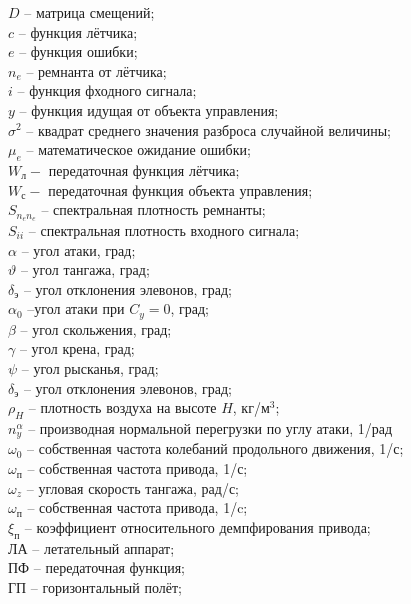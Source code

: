 $D$ -- матрица смещений; \\  
$c$ -- функция лётчика; \\
$e$ -- функция ошибки; \\ 
$n_e$ -- ремнанта от лётчика; \\  
$i$ -- функция фходного сигнала; \\ 
$y$ -- функция идущая от объекта управления; \\ 
$\sigma^2$ -- квадрат среднего значения разброса случайной величины; \\ 
$\mu_e$ -- математическое ожидание ошибки; \\ 
$W_\text{л} - $  передаточная функция лётчика; \\ 
$W_\text{с} - $  передаточная функция объекта управления; \\ 
$S_{n_e  n_e}$ -- спектральная плотность ремнанты; \\ 
$S_{ii}$ -- спектральная плотность входного сигнала; \\ 
$\alpha$ -- угол атаки, град; \\ 
$\vartheta$ -- угол тангажа, град; \\ 
$\delta_\text{э}$ -- угол отклонения элевонов, град; \\ 
$\alpha_0$ --угол атаки при $C_y = 0$, град;\\
$\beta$ -- угол скольжения, град; \\
$\gamma$ -- угол крена, град;\\
$\psi$ -- угол рысканья, град;\\ 
$\delta_\text{э}$ -- угол отклонения элевонов, град;\\
$\rho_H$ -- плотность воздуха на высоте $H$, кг/м$^3$;\\
$n_y^\alpha$ – производная нормальной перегрузки по углу атаки, 1/рад \\
$\omega_0$ -- собственная частота колебаний продольного движения, 1/с; \\ 
$\omega_\text{п}$ -- собственная частота привода, 1/с; \\ 
$\omega_z$ -- угловая скорость тангажа, рад/с; \\ 
$\omega_\text{п}$ -- собственная частота привода, 1/c; \\
$\xi_\text{п}$ -- коэффициент относительного демпфирования привода; \\
ЛА -- летательный аппарат; \\ 
ПФ -- передаточная функция; \\ 
ГП -- горизонтальный полёт; \\
